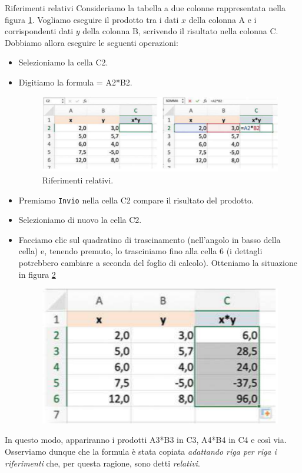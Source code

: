 \documentclass[12pt,a4paper,oneside]{book}
\makeatletter
\renewcommand{\subsubsection}{\@startsection {subsubsection}{3}{\z@}
{-2ex \@plus -0.1ex \@minus -.2ex}
{.2ex \@plus.2ex }
{\color[rgb]{0.141,0.596,0.749}\normalfont\small\sffamily\bfseries}}
\theoremstyle{esercizio}
\makeatother
\begin{document}
\subsubsection{Riferimenti relativi}
Consideriamo la tabella a due colonne rappresentata nella figura \ref{fig:rifrel}. Vogliamo
eseguire il prodotto tra i dati $x$ della colonna A e i corrispondenti dati $y$ della 
colonna B, scrivendo il risultato nella colonna C. Dobbiamo allora eseguire le
seguenti operazioni:
\begin{itemize}
    \item Selezioniamo la cella C2.
    \item Digitiamo la formula = A2*B2.
    \begin{figure}[h!]
        \centering
        \includegraphics[scale=0.4]{img/riferimenti-relativi.png} 
        \caption{Riferimenti relativi.}
        \label{fig:rifrel}
    \end{figure}
    \item Premiamo \texttt{Invio} nella cella C2 compare il risultato del prodotto.
    \item Selezioniamo di nuovo la cella C2.
    \item Facciamo clic sul quadratino di trascinamento (nell'angolo in basso della cella) e,
    tenendo premuto, lo trasciniamo fino alla cella 6 (i dettagli potrebbero cambiare
    a seconda del foglio di calcolo). Otteniamo la situazione in figura \ref{fig:copyform}
    \begin{figure}[h!]
        \centering
        \includegraphics[scale=0.4]{img/copia-formula.png} 
        \caption{}
        \label{fig:copyform}
    \end{figure} 
\end{itemize}
In questo modo, appariranno i prodotti A3*B3 in C3, A4*B4 in C4 e così via. 
Osserviamo dunque che la formula è stata copiata \textit{adattando riga per riga i riferimenti} che, per questa
ragione, sono detti \textit{relativi}.
\end{document}
